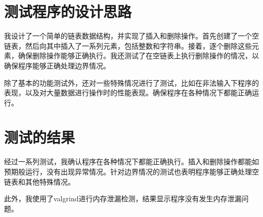 \documentclass[UTF8]{ctexart}
\begin{document}
\pagestyle{fancy}
\fancyhead{}

\section{测试程序的设计思路}

我设计了一个简单的链表数据结构，并实现了插入和删除操作。首先创建了一个空链表，然后向其中插入了一系列元素，包括整数和字符串。接着，逐个删除这些元素，确保删除操作能够正确执行。我还测试了在空链表上执行删除操作的情况，以确保程序能够正确处理边界情况。  

除了基本的功能测试外，还对一些特殊情况进行了测试，比如在非法输入下程序的表现，以及对大量数据进行操作时的性能表现。确保程序在各种情况下都能正确运行。  

\section{测试的结果}

经过一系列测试，我确认程序在各种情况下都能正确执行。插入和删除操作都能如预期般运行，没有出现异常情况。针对边界情况的测试也表明程序能够正确处理空链表和其他特殊情况。  
  
此外，我使用了valgrind进行内存泄漏检测，结果显示程序没有发生内存泄漏问题。  
  
\end{document}
